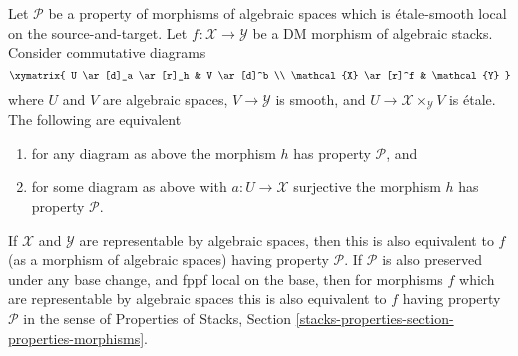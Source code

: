 \begin{lemma}
\label{lemma-etale-smooth-local-source-target}
Let $\mathcal{P}$ be a property of morphisms of algebraic spaces
which is \'etale-smooth local on the source-and-target.
Let $f : \mathcal{X} \to \mathcal{Y}$ be a DM morphism of algebraic stacks.
Consider commutative diagrams
$$
\xymatrix{
U \ar[d]_a \ar[r]_h & V \ar[d]^b \\
\mathcal{X} \ar[r]^f & \mathcal{Y}
}
$$
where $U$ and $V$ are algebraic spaces, $V \to \mathcal{Y}$ is smooth,
and $U \to \mathcal{X} \times_\mathcal{Y} V$ is \'etale.
The following are equivalent
\begin{enumerate}
\item for any diagram as above the morphism $h$ has property $\mathcal{P}$, and
\item for some diagram as above with $a : U \to \mathcal{X}$ surjective
the morphism $h$ has property $\mathcal{P}$.
\end{enumerate}
If $\mathcal{X}$ and $\mathcal{Y}$ are representable by algebraic spaces,
then this is also equivalent to $f$ (as a morphism of algebraic spaces)
having property $\mathcal{P}$. If $\mathcal{P}$ is also preserved under
any base change, and fppf local on the base, then for morphisms $f$
which are representable by algebraic spaces this
is also equivalent to $f$ having property $\mathcal{P}$ in the sense
of
Properties of Stacks,
Section \ref{stacks-properties-section-properties-morphisms}.
\end{lemma}

